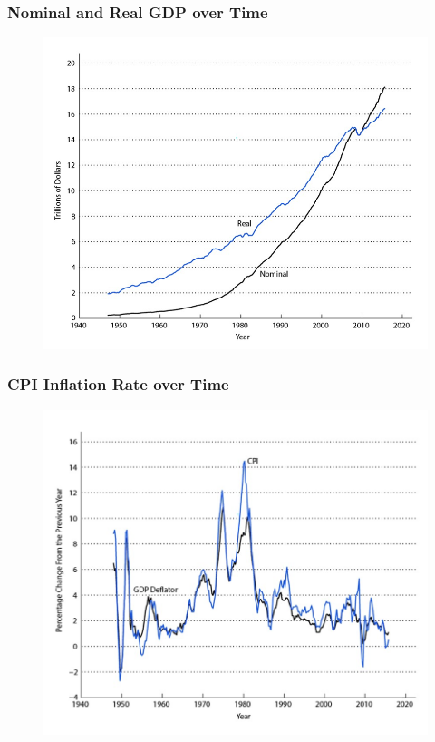 \documentclass{beamer}
\begin{document}
\begin{frame}
\frametitle[alignment=center]{Nominal and Real GDP over Time}
\begin{figure}
\includegraphics[scale=0.6]{Figures/W_Fig_2pt1.png}
\end{figure}
\end{frame}


\begin{frame}
\frametitle[alignment=center]{CPI Inflation Rate over Time}
\begin{figure}
\includegraphics[scale=0.6]{Figures/W_Fig_2pt2.png}
\end{figure}
\end{frame}
\end{document}
